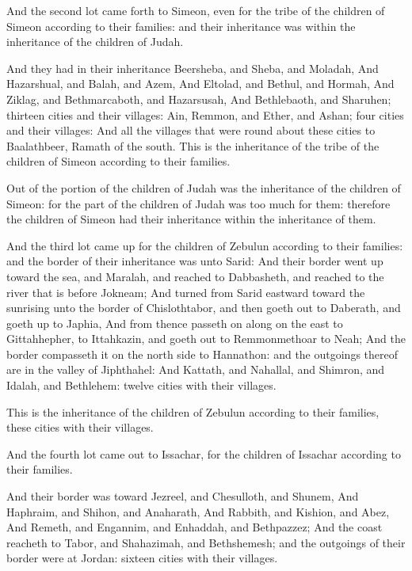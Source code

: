 \Chapter
\Verse And the second lot came forth to Simeon, even for the tribe of the children of Simeon according to their families: and their inheritance was within the inheritance of the children of Judah.

\Verse And they had in their inheritance Beersheba, and Sheba, and Moladah, \Verse And Hazarshual, and Balah, and Azem, \Verse And Eltolad, and Bethul, and Hormah, \Verse And Ziklag, and Bethmarcaboth, and Hazarsusah, \Verse And Bethlebaoth, and Sharuhen; thirteen cities and their villages: \Verse Ain, Remmon, and Ether, and Ashan; four cities and their villages: \Verse And all the villages that were round about these cities to Baalathbeer, Ramath of the south. This is the inheritance of the tribe of the children of Simeon according to their families.

\Verse Out of the portion of the children of Judah was the inheritance of the children of Simeon: for the part of the children of Judah was too much for them: therefore the children of Simeon had their inheritance within the inheritance of them.

\Verse And the third lot came up for the children of Zebulun according to their families: and the border of their inheritance was unto Sarid: \Verse And their border went up toward the sea, and Maralah, and reached to Dabbasheth, and reached to the river that is before Jokneam; \Verse And turned from Sarid eastward toward the sunrising unto the border of Chislothtabor, and then goeth out to Daberath, and goeth up to Japhia, \Verse And from thence passeth on along on the east to Gittahhepher, to Ittahkazin, and goeth out to Remmonmethoar to Neah; \Verse And the border compasseth it on the north side to Hannathon: and the outgoings thereof are in the valley of Jiphthahel: \Verse And Kattath, and Nahallal, and Shimron, and Idalah, and Bethlehem: twelve cities with their villages.

\Verse This is the inheritance of the children of Zebulun according to their families, these cities with their villages.

\Verse And the fourth lot came out to Issachar, for the children of Issachar according to their families.

\Verse And their border was toward Jezreel, and Chesulloth, and Shunem, \Verse And Haphraim, and Shihon, and Anaharath, \Verse And Rabbith, and Kishion, and Abez, \Verse And Remeth, and Engannim, and Enhaddah, and Bethpazzez; \Verse And the coast reacheth to Tabor, and Shahazimah, and Bethshemesh; and the outgoings of their border were at Jordan: sixteen cities with their villages.

